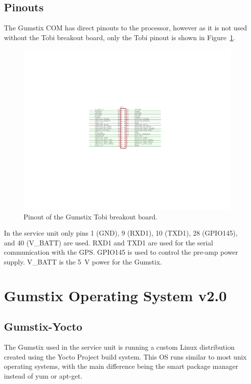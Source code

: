 \documentclass[12pt, letterpaper, onecolumn, oneside]{article}
\begin{document}
\subsection{Pinouts}

The Gumstix COM has direct pinouts to the processor, however as it is not used without the Tobi breakout board, only the Tobi pinout is shown in Figure~\ref{app:gumstix:fig:tobi}.

\begin{figure}[ht!]
   \centering
   \includegraphics[scale=1]{Figures/tobi_pinout.pdf}
   \caption{Pinout of the Gumstix Tobi breakout board.}
   \label{app:gumstix:fig:tobi}
\end{figure}

In the service unit only pins 1 (GND), 9 (RXD1), 10 (TXD1), 28 (GPIO145), and 40 (V\_BATT) are used.
RXD1 and TXD1 are used for the serial communication with the GPS.
GPIO145 is used to control the pre-amp power supply.
V\_BATT is the 5~V power for the Gumstix.

\section{Gumstix Operating System v2.0}

\subsection{Gumstix-Yocto}

The Gumstix used in the service unit is running a custom Linux distribution created using the Yocto Project build system.
This OS runs similar to most unix operating systems, with the main difference being the smart package manager instead of yum or apt-get.
\end{document}
